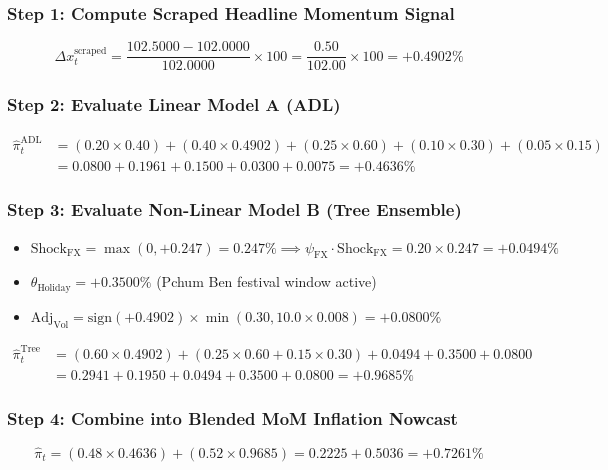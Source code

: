 \documentclass[11pt,a4paper]{article}
\begin{document}
\subsubsection*{Step 1: Compute Scraped Headline Momentum Signal}
\begin{equation*}
    \Delta x_t^{\text{scraped}} = \frac{102.5000 - 102.0000}{102.0000} \times 100 = \frac{0.50}{102.00} \times 100 = \mathbf{+0.4902\%}
\end{equation*}

\subsubsection*{Step 2: Evaluate Linear Model A (ADL)}
\begin{align*}
    \hat{\pi}_t^{\text{ADL}} &= (0.20 \times 0.40) + (0.40 \times 0.4902) + (0.25 \times 0.60) + (0.10 \times 0.30) + (0.05 \times 0.15) \\
    &= 0.0800 + 0.1961 + 0.1500 + 0.0300 + 0.0075 = \mathbf{+0.4636\%}
\end{align*}

\subsubsection*{Step 3: Evaluate Non-Linear Model B (Tree Ensemble)}
\begin{itemize}
    \item $\text{Shock}_{\text{FX}} = \max(0, +0.247) = 0.247\% \implies \psi_{\text{FX}} \cdot \text{Shock}_{\text{FX}} = 0.20 \times 0.247 = +0.0494\%$
    \item $\theta_{\text{Holiday}} = +0.3500\%$ (Pchum Ben festival window active)
    \item $\text{Adj}_{\text{Vol}} = \text{sign}(+0.4902) \times \min(0.30, 10.0 \times 0.008) = +0.0800\%$
\end{itemize}
\begin{align*}
    \hat{\pi}_t^{\text{Tree}} &= (0.60 \times 0.4902) + (0.25 \times 0.60 + 0.15 \times 0.30) + 0.0494 + 0.3500 + 0.0800 \\
    &= 0.2941 + 0.1950 + 0.0494 + 0.3500 + 0.0800 = \mathbf{+0.9685\%}
\end{align*}

\subsubsection*{Step 4: Combine into Blended MoM Inflation Nowcast}
\begin{equation*}
    \hat{\pi}_t = (0.48 \times 0.4636) + (0.52 \times 0.9685) = 0.2225 + 0.5036 = \mathbf{+0.7261\%}
\end{equation*}
\end{document}
